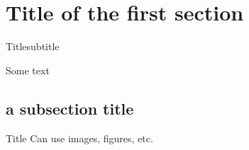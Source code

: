 \section{Title of the first section}\label{sec:first_section}

    \frame{\sectionpage}
        
        \begin{frame}{Title}{subtitle}
            \begin{center}
                Some text
            \end{center}
        \end{frame}

        \subsection{a subsection title}\label{subsec:subsection}

    \frame{\sectionpage}
    
        \begin{frame}{Title}
            Can use images, figures, etc.
        \end{frame}
